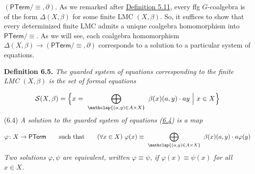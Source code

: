 \hypertarget{html:S6.SSx1.p1.m2}{}\({(\mathsf{PTerm}/{\equiv},\partial)}\). As we remarked after \hyperlink{html:S5.Thmtheorem11}{Definition 5.11}, every ffg %
\hypertarget{html:S6.SSx1.p1.m3}{}\({G}\)-coalgebra is of the form %
\hypertarget{html:S6.SSx1.p1.m4}{}\({\Delta(X,\beta)}\) for some finite LMC %
\hypertarget{html:S6.SSx1.p1.m5}{}\({(X,\beta)}\). So, it suffices to show that every determinized finite LMC admits a unique coalgebra homomorphism into %
\hypertarget{html:S6.SSx1.p1.m6}{}\({\mathsf{PTerm}/{\equiv}}\). As we will see, each coalgebra homomorphism %
\hypertarget{html:S6.SSx1.p1.m7}{}\({\Delta(X,\beta)\to(\mathsf{PTerm}/{\equiv},\partial)}\) corresponds to a solution to a particular system of equations.
\par\medskip
\hypertarget{html:S6.Thmtheorem5}{} \par\noindent\textbf{\textbf{Definition 6.5}\textbf{.}}\quad  %
\hypertarget{html:S6.Thmtheorem5.p1}{} \emph{The \emph{guarded system of equations} corresponding to the finite LMC %
\hypertarget{html:S6.Thmtheorem5.p1.m1}{}\({(X,\beta)}\) is the set of formal equations}
\par\medskip
\hypertarget{html:S6.E4}{}   %
\hypertarget{html:S6.E4.m1}{}\[\mathcal{S}(X,\beta)=\Big{\{}x=\leavevmode\nobreak\ \bigoplus_{\mathclap{(a,y)\in A\times X}}\leavevmode\nobreak\ \beta(x)(a,y)\cdot ay\leavevmode\nobreak\ \Big{|}\leavevmode\nobreak\ x\in X\Big{\}}\]  (6.4)   \emph{A \emph{solution} to the guarded system of equations (\hyperlink{html:S6.E4}{6.4}) is a map}
\par\medskip
\hypertarget{html:S6.Ex2}{}   %
\hypertarget{html:S6.Ex2.m1}{}\[\varphi\colon X\to\mathsf{PTerm}\qquad\text{such that}\qquad(\forall x\in X)\leavevmode\nobreak\ \varphi(x)\equiv\leavevmode\nobreak\ \bigoplus_{\mathclap{(a,y)\in A\times X}}\leavevmode\nobreak\ \beta(x)(a,y)\cdot a\varphi(y)\]    \emph{Two solutions %
\hypertarget{html:S6.Thmtheorem5.p1.m2}{}\({\varphi,\psi}\) are \emph{equivalent}, written %
\hypertarget{html:S6.Thmtheorem5.p1.m3}{}\({\varphi\equiv\psi}\), if %
\hypertarget{html:S6.Thmtheorem5.p1.m4}{}\({\varphi(x)\equiv\psi(x)}\) for all %
\hypertarget{html:S6.Thmtheorem5.p1.m5}{}\({x\in X}\).}
